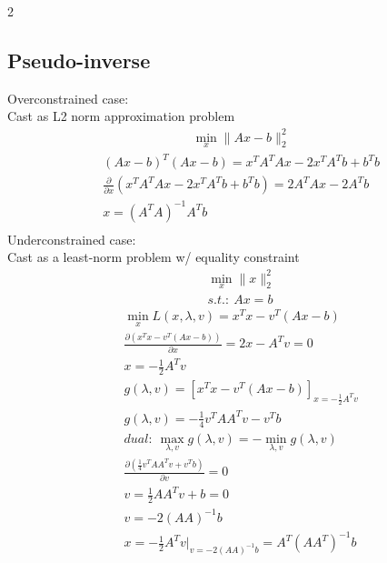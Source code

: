 \documentclass[8pt]{extarticle}
\newcommand{\norm}[1]{\|#1\|}
\newcommand{\ppartial}[2]{\frac{\partial #1}{\partial #2}}
\begin{document}
\begin{multicols*}{2}
  \subsection{Pseudo-inverse}
  Overconstrained case:\\
  Cast as L2 norm approximation problem
  \begin{align*}
    &\min_x \norm{Ax-b}_2^2
  \end{align*}
  \begin{align*}
    &(Ax-b)^T(Ax-b)=x^TA^TAx -2x^TA^Tb +b^Tb\\
    &\frac{\partial}{\partial x}(x^TA^TAx -2x^TA^Tb +b^Tb)=2A^T Ax - 2A^Tb\\
    &x = (A^T A)^{-1} A^Tb\\
  \end{align*}
  Underconstrained case:\\
  Cast as a least-norm problem w/ equality constraint
  \begin{align*}
    &\min_x \norm{x}_2^2\\
    &s.t.:\ Ax=b
  \end{align*}
  \begin{align*}
    &\min_x L(x,\lambda,v) = x^Tx -v^T(Ax-b)\\
    &\ppartial{(x^Tx -v^T(Ax-b))}{x} = 2x-A^Tv=0\\
    &x=-\frac{1}{2} A^Tv\\
    &g(\lambda,v) = [x^Tx -v^T(Ax-b)]_{x=-\frac{1}{2} A^Tv}\\
    &g(\lambda,v) = -\frac{1}{4}v^TAA^Tv - v^Tb\\
    &dual:\ \max_{\lambda,v} g(\lambda,v)=-\min_{\lambda,v} g(\lambda,v)\\
    &\ppartial{(\frac{1}{4}v^TAA^Tv + v^Tb)}{v}=0\\
    &v=\frac{1}{2}AA^Tv+b=0\\
    &v=-2(AA)^{-1}b\\
    &x=-\frac{1}{2} A^Tv|_{v=-2(AA)^{-1}b}= A^T(AA^T)^{-1}b\\
  \end{align*}


\end{multicols*}
\end{document}
